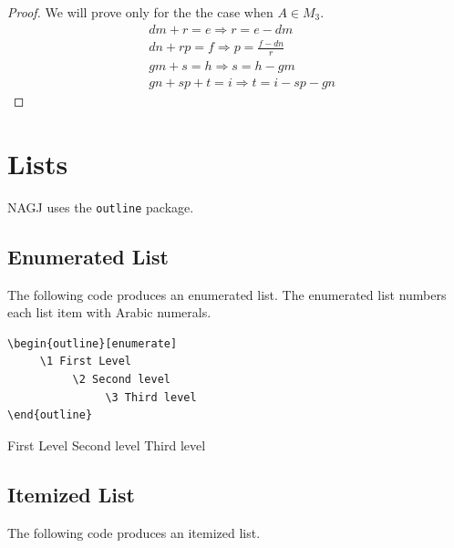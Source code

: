 \begin{proof} We will prove only for the the case when $A \in M_3$. \\
 \begin{align} 
&dm + r = e  \Rightarrow r = e-dm \label{eqn:1}\\
&dn + rp = f \Rightarrow p=\frac{f-dn}{r} \label{eqn:2}\\
&gm + s = h \Rightarrow s = h - gm \label{eqn:3}\\
&gn + sp + t = i \Rightarrow t  = i-sp-gn \label{eqn:4}
\end{align}
 
\end{proof}

 

 







 









 \section{Lists}
 NAGJ uses the \verb|outline| package.   
  
 \subsection{Enumerated List}
 The following code produces an enumerated list.  The enumerated list numbers each list item with Arabic numerals.
 
\begin{verbatim}
\begin{outline}[enumerate]
     \1 First Level
          \2 Second level
               \3 Third level
\end{outline}
 \end{verbatim}
 
 \begin{outline}[enumerate]
 	\1 First Level
		\2 Second level
			\3 Third level
\end{outline}
 
 
 
 \subsection{Itemized List}
 The following code produces an itemized list.
 
